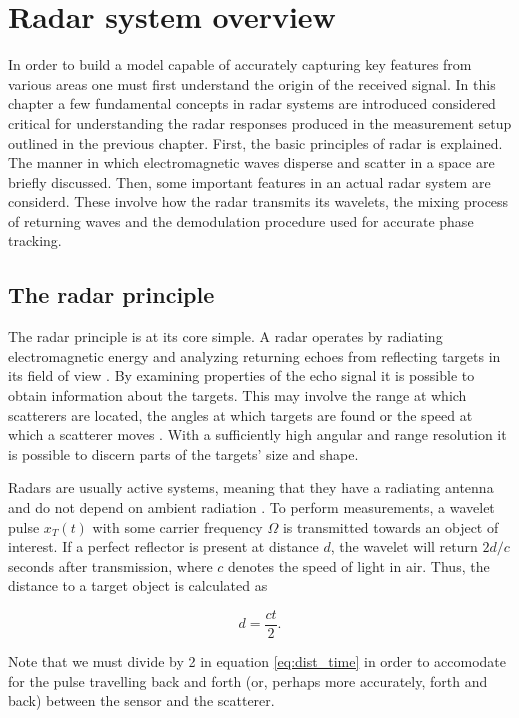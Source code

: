 \chapter{Radar system overview}


In order to build a model capable of accurately capturing key features from various areas one must first understand the origin of the received signal. In this chapter a few fundamental concepts in radar systems are introduced considered critical for understanding the radar responses produced in the measurement setup outlined in the previous chapter. First, the basic principles of radar is explained. The manner in which electromagnetic waves disperse and scatter in a space are briefly discussed. Then, some important features in an actual radar system are considerd. These involve how the radar transmits its wavelets, the mixing process of returning waves and the demodulation procedure used for accurate phase tracking. 

\section{The radar principle}

The radar principle is at its core simple. A radar operates by radiating electromagnetic energy and analyzing returning echoes from reflecting targets in its field of view \citep{skolnik_2009}. By examining properties of the echo signal it is possible to obtain information about the targets. This may involve the range at which scatterers are located, the angles at which targets are found or the speed at which a scatterer moves \citep{richards_2014}. With a sufficiently high angular and range resolution it is possible to discern parts of the targets' size and shape. 

Radars are usually active systems, meaning that they have a radiating antenna and do not depend on ambient radiation \citep{skolnik_2009}. To perform measurements, a wavelet pulse $x_T(t)$ with some carrier frequency $\Omega$  is transmitted towards an object of interest. If a perfect reflector is present at distance $d$, the wavelet will return $2d/c$ seconds after transmission, where $c$ denotes the speed of light in air. Thus, the distance to a target object is calculated as 

\begin{equation}
	\label{eq:dist_time}
	d = \frac{ct}{2}.
\end{equation}

Note that we must divide by 2 in equation \ref{eq:dist_time} in order to accomodate for the pulse travelling back and forth (or, perhaps more accurately, forth and back) between the sensor and the scatterer. 

